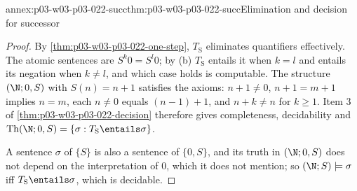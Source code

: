 \begin{annexitem}{annex:p03-w03-p03-022-succ}{thm:p03-w03-p03-022-succ}{Elimination and decision for successor}
\begin{proof}
By \cref{thm:p03-w03-p03-022-one-step}, \(T_{\mathrm S}\) eliminates
quantifiers effectively. The atomic sentences are \(S^k0=S^l0\); by (b)
\(T_{\mathrm S}\) entails it when \(k=l\) and entails its negation when
\(k\ne l\), and which case holds is computable. The structure
\((\N;0,S)\) with \(S(n)=n+1\) satisfies the axioms: \(n+1\ne0\),
\(n+1=m+1\) implies \(n=m\), each \(n\ne0\) equals \((n-1)+1\), and
\(n+k\ne n\) for \(k\ge1\). Item 3 of \cref{thm:p03-w03-p03-022-decision}
therefore gives completeness, decidability and
\(\operatorname{Th}(\N;0,S)=\{\sigma:T_{\mathrm S}\entails\sigma\}\).

A sentence \(\sigma\) of \(\{S\}\) is also a sentence of \(\{0,S\}\), and
its truth in \((\N;0,S)\) does not depend on the interpretation of \(0\),
which it does not mention; so \((\N;S)\models\sigma\) iff
\(T_{\mathrm S}\entails\sigma\), which is decidable.
\end{proof}
\end{annexitem}

